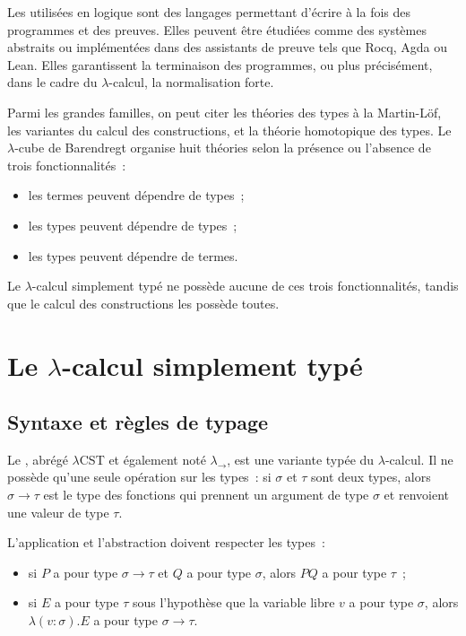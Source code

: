 \thingy Les  utilisées en logique sont des
langages permettant d'écrire à la fois des programmes et des preuves.
Elles peuvent être étudiées comme des systèmes abstraits ou
implémentées dans des assistants de preuve tels que Rocq, Agda ou Lean.
Elles garantissent la terminaison des programmes, ou plus précisément,
dans le cadre du $\lambda$-calcul, la normalisation forte.

Parmi les grandes familles, on peut citer les théories des types à la
Martin-Löf, les variantes du calcul des constructions, et la théorie
homotopique des types. Le $\lambda$-cube de Barendregt organise huit
théories selon la présence ou l'absence de trois fonctionnalités :
\begin{itemize}
\item les termes peuvent dépendre de types ;
\item les types peuvent dépendre de types ;
\item les types peuvent dépendre de termes.
\end{itemize}
Le $\lambda$-calcul simplement typé ne possède aucune de ces trois
fonctionnalités, tandis que le calcul des constructions les possède
toutes.

\section{Le \texorpdfstring{$\lambda$}{lambda}-calcul simplement typé}

\subsection{Syntaxe et règles de typage}

\thingy Le , abrégé
$\lambda$CST et également noté $\lambda_\rightarrow$, est une variante
typée du $\lambda$-calcul. Il ne possède qu'une seule opération sur les
types : si $\sigma$ et $\tau$ sont deux types, alors
$\sigma\to\tau$ est le type des fonctions qui prennent un argument de
type $\sigma$ et renvoient une valeur de type $\tau$.

L'application et l'abstraction doivent respecter les types :
\begin{itemize}
\item si $P$ a pour type $\sigma\to\tau$ et $Q$ a pour type $\sigma$,
  alors $PQ$ a pour type $\tau$ ;
\item si $E$ a pour type $\tau$ sous l'hypothèse que la variable libre
  $v$ a pour type $\sigma$, alors
  $\lambda(v:\sigma).E$ a pour type $\sigma\to\tau$.
\end{itemize}

